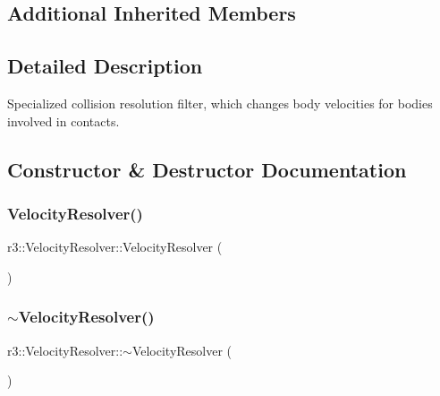 \subsection*{Additional Inherited Members}


\subsection{Detailed Description}
Specialized collision resolution filter, which changes body velocities for bodies involved in contacts. 

\subsection{Constructor \& Destructor Documentation}
\mbox{\label{classr3_1_1_velocity_resolver_a827566c5d9dca936b4609dc74c587a6f}} 
\subsubsection{\texorpdfstring{Velocity\+Resolver()}{VelocityResolver()}}
{\footnotesize\ttfamily r3\+::\+Velocity\+Resolver\+::\+Velocity\+Resolver (\begin{DoxyParamCaption}{ }\end{DoxyParamCaption})\hspace{0.3cm}{\ttfamily [explicit]}}

\mbox{\label{classr3_1_1_velocity_resolver_a508677a0bf2d5258ffc1550677517074}} 
\subsubsection{\texorpdfstring{$\sim$\+Velocity\+Resolver()}{~VelocityResolver()}}
{\footnotesize\ttfamily r3\+::\+Velocity\+Resolver\+::$\sim$\+Velocity\+Resolver (\begin{DoxyParamCaption}{ }\end{DoxyParamCaption})\hspace{0.3cm}{\ttfamily [default]}}



